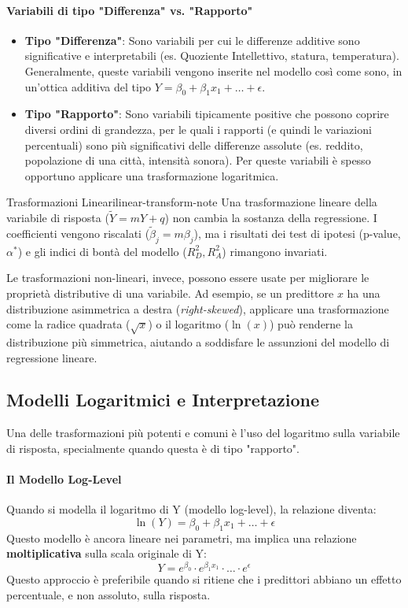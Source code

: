 \paragraph{Variabili di tipo "Differenza" vs. "Rapporto"}
\begin{itemize}
    \item \textbf{Tipo "Differenza"}: Sono variabili per cui le differenze
    additive sono significative e interpretabili (es. Quoziente Intellettivo,
    statura, temperatura). Generalmente, queste variabili vengono inserite nel
    modello così come sono, in un'ottica additiva del tipo \( Y = \beta_0 +
    \beta_1 x_1 + \dots + \epsilon \).
    \item \textbf{Tipo "Rapporto"}: Sono variabili tipicamente positive che
    possono coprire diversi ordini di grandezza, per le quali i rapporti (e
    quindi le variazioni percentuali) sono più significativi delle differenze
    assolute (es. reddito, popolazione di una città, intensità sonora). Per
    queste variabili è spesso opportuno applicare una trasformazione
    logaritmica.
\end{itemize}

\begin{nota}{Trasformazioni Lineari}{linear-transform-note}
Una trasformazione lineare della variabile di risposta (\(\tilde{Y} = mY+q\))
non cambia la sostanza della regressione. I coefficienti vengono riscalati
(\(\tilde{\beta}_j = m\beta_j\)), ma i risultati dei test di ipotesi (p-value,
\(\alpha^*\)) e gli indici di bontà del modello (\(R_D^2, R_A^2\)) rimangono
invariati.
\end{nota}
Le trasformazioni non-lineari, invece, possono essere usate per migliorare le
proprietà distributive di una variabile. Ad esempio, se un predittore \(x\) ha
una distribuzione asimmetrica a destra (\textit{right-skewed}), applicare una
trasformazione come la radice quadrata (\(\sqrt{x}\)) o il logaritmo
(\(\ln(x)\)) può renderne la distribuzione più simmetrica, aiutando a
soddisfare le assunzioni del modello di regressione lineare.

\subsection{Modelli Logaritmici e Interpretazione}

Una delle trasformazioni più potenti e comuni è l'uso del logaritmo sulla
variabile di risposta, specialmente quando questa è di tipo "rapporto".

\paragraph{Il Modello Log-Level}
Quando si modella il logaritmo di Y (modello log-level), la relazione diventa:
\[ \ln(Y) = \beta_0 + \beta_1 x_1 + \dots + \epsilon \]
Questo modello è ancora lineare nei parametri, ma implica una relazione
\textbf{moltiplicativa} sulla scala originale di Y:
\[ Y = e^{\beta_0} \cdot e^{\beta_1 x_1} \cdot \dots \cdot e^{\epsilon} \]
Questo approccio è preferibile quando si ritiene che i predittori abbiano un
effetto percentuale, e non assoluto, sulla risposta.

